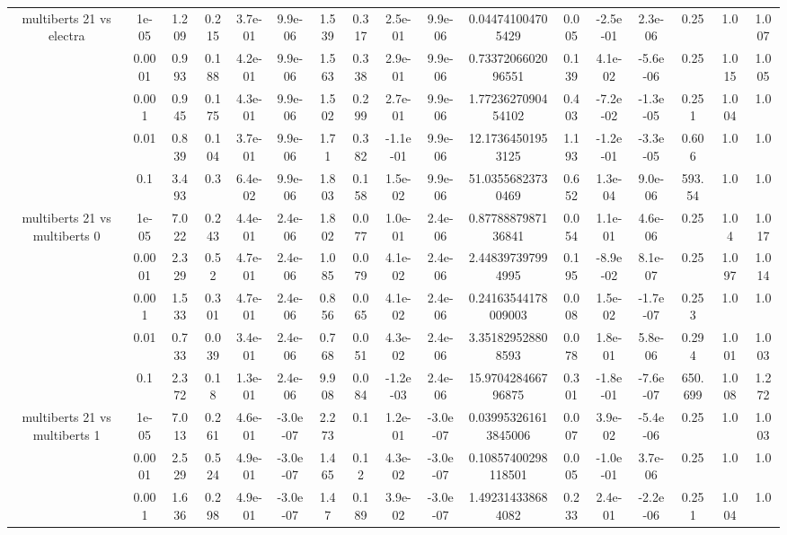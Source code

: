 \begin{tabular}{|c|c|c|c|c|c|c|c|c|c|c|c|c|c|c|c|c|}
\hline
\multirow{5}{*}{multiberts 21 vs electra } & 1e-05 & 1.209 & 0.215 & 3.7e-01 & 9.9e-06 & 1.539 & 0.317 & 2.5e-01 & 9.9e-06 & 0.044741004705429 & 0.005 & -2.5e-01 & 2.3e-06 & 0.25 & 1.0 & 1.007 \\
 & 0.0001 & 0.993 & 0.188 & 4.2e-01 & 9.9e-06 & 1.563 & 0.338 & 2.9e-01 & 9.9e-06 & 0.7337206602096551 & 0.139 & 4.1e-02 & -5.6e-06 & 0.25 & 1.015 & 1.005 \\
 & 0.001 & 0.945 & 0.175 & 4.3e-01 & 9.9e-06 & 1.502 & 0.299 & 2.7e-01 & 9.9e-06 & 1.7723627090454102 & 0.403 & -7.2e-02 & -1.3e-05 & 0.251 & 1.004 & 1.0 \\
 & 0.01 & 0.839 & 0.104 & 3.7e-01 & 9.9e-06 & 1.71 & 0.382 & -1.1e-01 & 9.9e-06 & 12.17364501953125 & 1.193 & -1.2e-01 & -3.3e-05 & 0.606 & 1.0 & 1.0 \\
 & 0.1 & 3.493 & 0.3 & 6.4e-02 & 9.9e-06 & 1.803 & 0.158 & 1.5e-02 & 9.9e-06 & 51.03556823730469 & 0.652 & 1.3e-04 & 9.0e-06 & 593.54 & 1.0 & 1.0 \\
\hline
\multirow{5}{*}{multiberts 21 vs multiberts 0} & 1e-05 & 7.022 & 0.243 & 4.4e-01 & 2.4e-06 & 1.802 & 0.077 & 1.0e-01 & 2.4e-06 & 0.8778887987136841 & 0.054 & 1.1e-01 & 4.6e-06 & 0.25 & 1.04 & 1.017 \\
 & 0.0001 & 2.329 & 0.52 & 4.7e-01 & 2.4e-06 & 1.085 & 0.079 & 4.1e-02 & 2.4e-06 & 2.448397397994995 & 0.195 & -8.9e-02 & 8.1e-07 & 0.25 & 1.097 & 1.014 \\
 & 0.001 & 1.533 & 0.301 & 4.7e-01 & 2.4e-06 & 0.856 & 0.065 & 4.1e-02 & 2.4e-06 & 0.24163544178009003 & 0.008 & 1.5e-02 & -1.7e-07 & 0.253 & 1.0 & 1.0 \\
 & 0.01 & 0.733 & 0.039 & 3.4e-01 & 2.4e-06 & 0.768 & 0.051 & 4.3e-02 & 2.4e-06 & 3.351829528808593 & 0.078 & 1.8e-01 & 5.8e-06 & 0.294 & 1.001 & 1.003 \\
 & 0.1 & 2.372 & 0.18 & 1.3e-01 & 2.4e-06 & 9.908 & 0.084 & -1.2e-03 & 2.4e-06 & 15.970428466796875 & 0.301 & -1.8e-01 & -7.6e-07 & 650.699 & 1.008 & 1.272 \\
\hline
\multirow{5}{*}{multiberts 21 vs multiberts 1} & 1e-05 & 7.013 & 0.261 & 4.6e-01 & -3.0e-07 & 2.273 & 0.1 & 1.2e-01 & -3.0e-07 & 0.039953261613845006 & 0.007 & 3.9e-02 & -5.4e-06 & 0.25 & 1.0 & 1.003 \\
 & 0.0001 & 2.529 & 0.524 & 4.9e-01 & -3.0e-07 & 1.465 & 0.12 & 4.3e-02 & -3.0e-07 & 0.10857400298118501 & 0.005 & -1.0e-01 & 3.7e-06 & 0.25 & 1.0 & 1.0 \\
 & 0.001 & 1.636 & 0.298 & 4.9e-01 & -3.0e-07 & 1.47 & 0.189 & 3.9e-02 & -3.0e-07 & 1.492314338684082 & 0.233 & 2.4e-01 & -2.2e-06 & 0.251 & 1.004 & 1.0 \\

\end{tabular}

